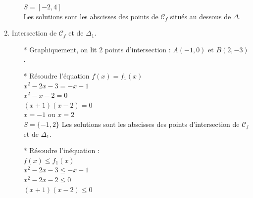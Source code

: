 \begin{enumerate}
\begin{itemize}
$S = [-2, 4]$ \\

Les solutions sont les abscisses des points de $\mathcal{C}_f$ situés au dessous de $\Delta$.\\

\end{itemize}

\item Intersection de $\mathcal{C}_f$ et de $\Delta_1$.

\begin{itemize}
\item [*] Graphiquement, on lit 2 points d'intersection : $A(-1, 0)$ et $B(2, -3)$.

\item [*] Résoudre l'équation $f(x) = f_1(x)$\\

$ x^2 -2x -3 = -x - 1$\\
$ x^2 -x  -2 = 0 $\\
$(x + 1) (x - 2) = 0 $\\
$x = -1$ ou $ x = 2$ \\

$S=\{-1, 2\}$ Les solutions sont les abscisses 
               des points d'intersection de $\mathcal{C}_f$ et de $\Delta_1$.\\
               
               \newpage
               
\item [*] Résoudre l'inéquation : \\

$f(x) \leqslant f_1(x)$\\
$ x^2 -2x -3 \leqslant -x - 1$\\
$ x^2 -2x  -2 \leqslant 0 $\\
$(x + 1) (x - 2) \leqslant 0 $\\

 \\


\end{itemize}
\end{enumerate}
